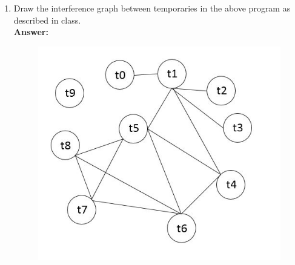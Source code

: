 \documentclass[11pt]{article}
\begin{document}
\begin{enumerate}
\begin{enumerate}
   \newpage
    \item Draw the interference graph between temporaries in the above program as described in class.\\
    \textbf{Answer:} 
       \begin{figure}[h]
    \includegraphics[width=15cm]{2.JPG}
    \end{figure}
    

\end{enumerate}
\end{enumerate}
\end{document}
